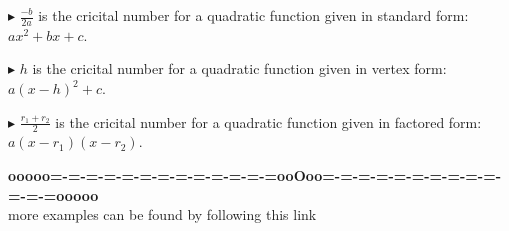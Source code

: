 \documentclass{ximera}
\begin{document}
\textbf{\textcolor{blue!55!black}{$\blacktriangleright$}}  $\frac{-b}{2a}$ is the cricital number for a quadratic function given in standard form: $a x^2 + b x + c$.



\textbf{\textcolor{blue!55!black}{$\blacktriangleright$}}  $h$ is the cricital number for a quadratic function given in vertex form: $a (x - h)^2 + c$.



\textbf{\textcolor{blue!55!black}{$\blacktriangleright$}}  $\frac{r_1 + r_2}{2}$ is the cricital number for a quadratic function given in factored form: $a (x - r_1) (x - r_2)$.







\begin{center}
\textbf{\textcolor{green!50!black}{ooooo=-=-=-=-=-=-=-=-=-=-=-=-=ooOoo=-=-=-=-=-=-=-=-=-=-=-=-=ooooo}} \\

more examples can be found by following this link\\ 

\end{center}
\end{document}

